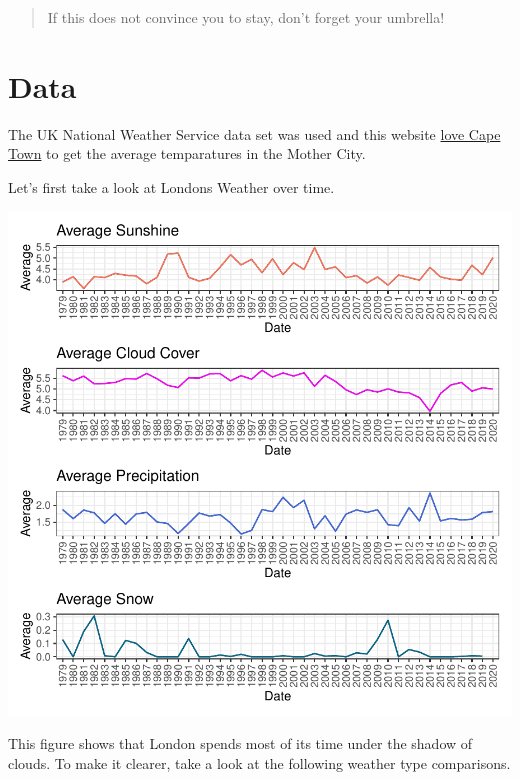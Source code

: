 \documentclass[11pt,preprint, authoryear]{elsarticle}
\let\origfigure\figure
\let\endorigfigure\endfigure
\renewenvironment{figure}[1][2] {
    \expandafter\origfigure\expandafter[H]
} {
    \endorigfigure
}
\numberwithin{equation}{section}
\numberwithin{figure}{section}
\numberwithin{table}{section}
\begin{document}
\begin{quote}
If this does not convince you to stay, don't forget your umbrella!
\end{quote}

\hypertarget{data}{%
\section*{Data}\label{data}}

The UK National Weather Service data set was used and this website
\href{https://www.capetown.travel/plan-your-trip/weather-in-cape-town/}{love
Cape Town} to get the average temparatures in the Mother City.

Let's first take a look at Londons Weather over time.

\begin{figure}[H]

{\centering \includegraphics{Question-2_files/figure-latex/Figure1-1} 

}

\caption{London's Average Weather Over Time \label{Figure1}}\label{fig:Figure1}
\end{figure}

This figure shows that London spends most of its time under the shadow
of clouds. To make it clearer, take a look at the following weather type
comparisons.
\end{document}
